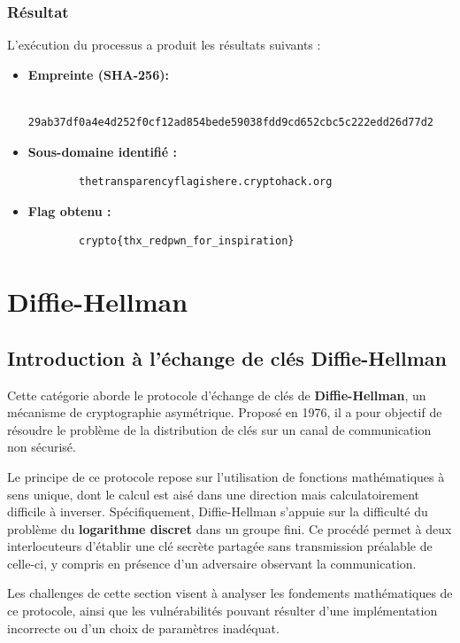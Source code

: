 \documentclass[12pt, a4paper]{article}
\begin{document}
    \subsubsection{Résultat}
    L'exécution du processus a produit les résultats suivants :
    \begin{itemize}
        \item \textbf{Empreinte (SHA-256):}
        \begin{verbatim}
        29ab37df0a4e4d252f0cf12ad854bede59038fdd9cd652cbc5c222edd26d77d2
        \end{verbatim}
        \item \textbf{Sous-domaine identifié :}
        \begin{verbatim}
        thetransparencyflagishere.cryptohack.org
        \end{verbatim}
        \item \textbf{Flag obtenu :}
        \begin{verbatim}
        crypto{thx_redpwn_for_inspiration}
        \end{verbatim}
    \end{itemize}

    \section{Diffie-Hellman}
    \subsection{Introduction à l'échange de clés Diffie-Hellman}
    Cette catégorie aborde le protocole d'échange de clés de
    \textbf{Diffie-Hellman}, un mécanisme de cryptographie asymétrique.
    Proposé en 1976, il a pour objectif de résoudre le problème de la
    distribution de clés sur un canal de communication non sécurisé.

    Le principe de ce protocole repose sur l'utilisation de fonctions
    mathématiques à sens unique, dont le calcul est aisé dans une direction
    mais calculatoirement difficile à inverser. Spécifiquement, Diffie-Hellman
    s'appuie sur la difficulté du problème du \textbf{logarithme discret} dans
    un groupe fini. Ce procédé permet à deux interlocuteurs d'établir une clé
    secrète partagée sans transmission préalable de celle-ci, y compris en
    présence d'un adversaire observant la communication.

    Les challenges de cette section visent à analyser les fondements
    mathématiques de ce protocole, ainsi que les vulnérabilités pouvant
    résulter d'une implémentation incorrecte ou d'un choix de paramètres
    inadéquat.
\end{document}
